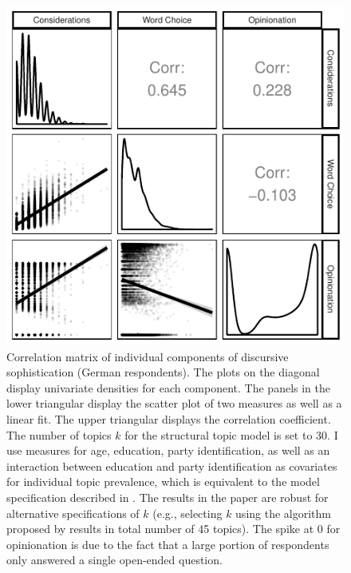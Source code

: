 \documentclass[12pt]{article}
\begin{document}
\begin{figure}[h]\centering
\includegraphics{../fig/swiss_corplot_german_components.pdf}
\caption{Correlation matrix of individual components of discursive sophistication (German respondents). The plots on the diagonal display univariate densities for each component. The panels in the lower triangular display the scatter plot of two measures as well as a linear fit. The upper triangular displays the correlation coefficient. The number of topics $k$ for the structural topic model is set to 30. I use measures for age, education, party identification, as well as an interaction between education and party identification as covariates for individual topic prevalence, which is equivalent to the model specification described in \citet{roberts2014structural}. The results in the paper are robust for alternative specifications of $k$ (e.g., selecting $k$ using the algorithm proposed by \citet{lee2014low} results in total number of 45 topics). The spike at 0 for opinionation is due to the fact that a large portion of respondents only answered a single open-ended question.}\label{fig:swiss_german_components}
\end{figure}
\end{document}
